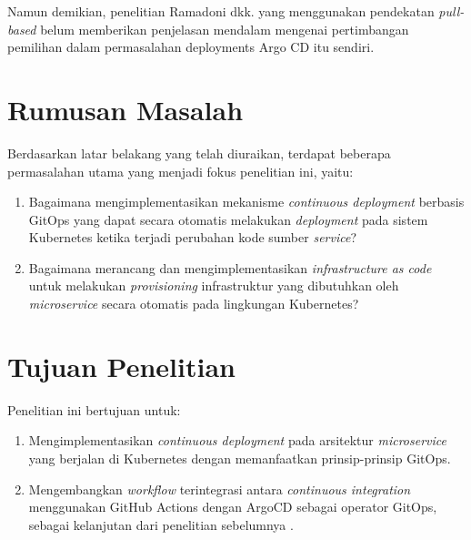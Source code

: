 Namun demikian, penelitian Ramadoni dkk. \cite{Ramadoni2021} yang menggunakan
pendekatan \textit{pull-based} belum memberikan penjelasan mendalam mengenai
pertimbangan pemilihan dalam permasalahan deployments Argo CD itu sendiri.
\vspace{0.5cm}
\newpage
\section{Rumusan Masalah}
Berdasarkan latar belakang yang telah diuraikan, terdapat beberapa permasalahan
utama yang menjadi fokus penelitian ini, yaitu:
\begin{enumerate}[label=\alph*., leftmargin=1.5\parindent]
  \item Bagaimana mengimplementasikan mekanisme \textit{continuous deployment} berbasis
        GitOps yang dapat secara otomatis melakukan \textit{deployment} pada sistem
        Kubernetes ketika terjadi perubahan kode sumber \textit{service}?
  \item Bagaimana merancang dan mengimplementasikan \textit{infrastructure as code}
        untuk melakukan \textit{provisioning} infrastruktur yang dibutuhkan oleh
        \textit{microservice} secara otomatis pada lingkungan Kubernetes?
\end{enumerate}

\vspace{0.5cm}
\section{Tujuan Penelitian}
Penelitian ini bertujuan untuk:
\begin{enumerate}[label=\alph*., leftmargin=1.5\parindent]
  \item Mengimplementasikan \textit{continuous deployment} pada arsitektur
        \textit{microservice} yang berjalan di Kubernetes dengan memanfaatkan
        prinsip-prinsip GitOps.
  \item Mengembangkan \textit{workflow} terintegrasi antara \textit{continuous
          integration} menggunakan GitHub Actions dengan ArgoCD sebagai operator GitOps,
        sebagai kelanjutan dari penelitian sebelumnya \cite{Ramadoni2021}.
\end{enumerate}

